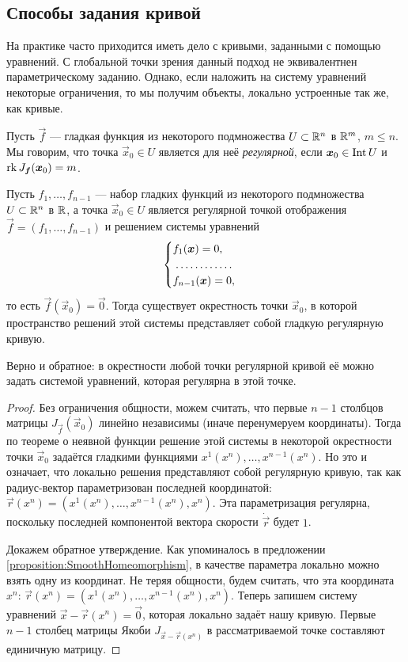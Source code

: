 \subsection{Способы задания кривой}

На практике часто приходится иметь дело с кривыми, заданными с помощью уравнений. С глобальной точки зрения данный подход не эквивалентнен параметрическому заданию. Однако, если наложить на систему уравнений некоторые ограничения, то мы получим объекты, локально устроенные так же, как кривые.

\begin{definition}
	Пусть $\vec{f}$ --- гладкая функция из некоторого подмножества $U \subset \mathbb{R}^n$ в $\mathbb{R}^m$, $m \leqslant n$. Мы говорим, что точка $\vec{x}_0 \in U$ является для неё \textit{регулярной}, если $\boldsymbol{x}_0 \in \operatorname{Int} U$ и $\operatorname{rk} J_{\boldsymbol{f}}(\boldsymbol{x}_0) = m$.
\end{definition}

\begin{theorem} \label{theorem:SurfacesToCurve}
	Пусть $f_1, \ldots, f_{n - 1}$ --- набор гладких функций из некоторого подмножества $U \subset \mathbb{R}^n$ в $\mathbb{R}$, а точка $\vec{x}_0 \in U$ является регулярной точкой отображения $\vec{f} = (f_1, \ldots, f_{n - 1})$ и решением системы уравнений
	\[
		\begin{cases}
			f_1(\vec{x}) = 0,\\
			\dotfill\\
			f_{n - 1}(\vec{x}) = 0,
		\end{cases}
	\]
	то есть $\vec{f}(\vec{x}_0) = \vec{0}$. Тогда существует окрестность точки $\vec{x}_0$, в которой пространство решений этой системы представляет собой гладкую регулярную кривую.
	
	Верно и обратное: в окрестности любой точки регулярной кривой её можно задать системой уравнений, которая регулярна в этой точке.
\end{theorem}

\begin{proof}
	Без ограничения общности, можем считать, что первые $n - 1$ столбцов матрицы $J_{\vec{f}}(\vec{x}_0)$ линейно независимы (иначе перенумеруем координаты). Тогда по теореме о неявной функции решение этой системы в некоторой окрестности точки $\vec{x}_0$ задаётся гладкими функциями $x^1(x^n), \ldots, x^{n - 1}(x^n)$. Но это и означает, что локально решения представляют собой регулярную кривую, так как радиус-вектор параметризован последней координатой: $\vec{r}(x^n) = (x^1(x^n), \ldots, x^{n - 1}(x^n), x^n)$. Эта параметризация регулярна, поскольку последней компонентой вектора скорости $\dot{\vec{r}}$ будет $1$.

	Докажем обратное утверждение. Как упоминалось в предложении \ref{proposition:SmoothHomeomorphism}, в качестве параметра локально можно взять одну из координат. Не теряя общности, будем считать, что эта координата $x^n$: $\vec{r}(x^n) = (x^1(x^n), \ldots, x^{n - 1}(x^n), x^n)$. Теперь запишем систему уравнений $\vec{x} - \vec{r}(x^n) = \vec{0}$, которая локально задаёт нашу кривую. Первые $n - 1$ столбец матрицы Якоби $J_{\vec{x} - \vec{r}(x^n)}$ в рассматриваемой точке составляют единичную матрицу.
\end{proof}

